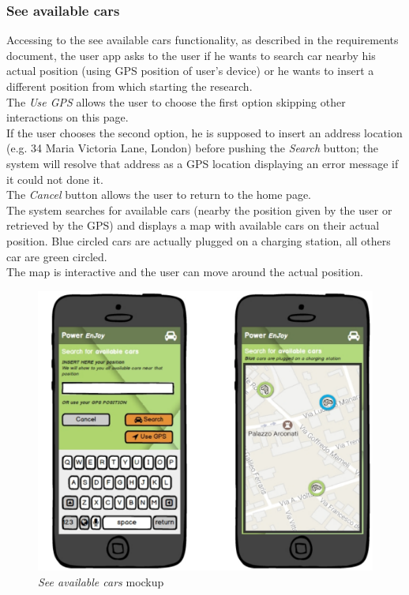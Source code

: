 \subsubsection{See available cars}
Accessing to the see available cars functionality, as described in the requirements document, the user app asks to the user if he wants to search car nearby his actual position (using GPS position of user's device) or he wants to insert a different position from which starting the research. \\

The \emph{Use GPS} allows the user to choose the first option skipping other interactions on this page. \\

If the user chooses the second option, he is supposed to insert an address location (e.g. 34 Maria Victoria Lane, London) before pushing the \emph{Search} button; the system will resolve that address as a GPS location displaying an error message if it could not done it. \\

The \emph{Cancel} button allows the user to return to the home page. \\

The system searches for available cars (nearby the position given by the user or retrieved by the GPS) and displays a map with available cars on their actual position. Blue circled cars are actually plugged on a charging station, all others car are green circled.\\

The map is interactive and the user can move around the actual position. \\

	\begin{figure}[h]
			\centering
			\includegraphics[width=0.9\linewidth]{mockups/findCar}
			\caption{
				\label{fig:searchCar} 
				\emph{See available cars} mockup
			}
		\end{figure}

